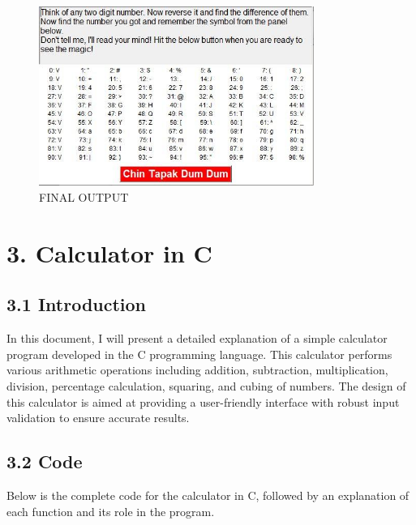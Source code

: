 \documentclass[a4paper,12pt]{article}
\begin{document}
\begin{figure}[h!]
    \centering
    \includegraphics[width=0.8\textwidth]{output.jpeg} %
    \caption{FINAL OUTPUT}
\end{figure}

\vspace{0.5cm}
\newpage

\section*{3. Calculator in C}

\subsection*{3.1 Introduction}
In this document, I will present a detailed explanation of a simple calculator program developed in the C programming language. This calculator performs various arithmetic operations including addition, subtraction, multiplication, division, percentage calculation, squaring, and cubing of numbers. The design of this calculator is aimed at providing a user-friendly interface with robust input validation to ensure accurate results.

\subsection*{3.2 Code}
Below is the complete code for the calculator in C, followed by an explanation of each function and its role in the program.
\end{document}
